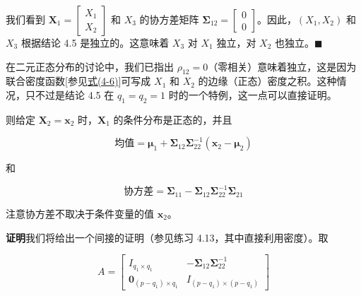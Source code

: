 我们看到 $\mathbf{X}_1=\begin{bmatrix}X_1\\X_2\end{bmatrix}$ 和 $X_3$ 的协方差矩阵 $\boldsymbol{\Sigma}_{12}=\begin{bmatrix}0\\0\end{bmatrix}$。因此，$(X_1,X_2)$ 和 $X_3$ 根据结论 4.5 是独立的。这意味着 $X_3$ 对 $X_1$ 独立，对 $X_2$ 也独立。\hfill$\blacksquare$

在二元正态分布的讨论中，我们已指出 $\rho_{12}=0$（零相关）意味着独立，这是因为联合密度函数[参见\hyperref[eq:4-6]{式(4-6)}]可写成 $X_1$ 和 $X_2$ 的边缘（正态）密度之积。这种情况，只不过是结论 4.5 在 $q_1=q_2=1$ 时的一个特例，这一点可以直接证明。


则给定 $\mathbf{X}_2=\mathbf{x}_2$ 时，$\mathbf{X}_1$ 的条件分布是正态的，并且

\[
\text{均值}=\boldsymbol{\mu}_1+\boldsymbol{\Sigma}_{12}\boldsymbol{\Sigma}_{22}^{-1}(\mathbf{x}_2-\boldsymbol{\mu}_2)
\]

和

\[
\text{协方差}=\boldsymbol{\Sigma}_{11}-\boldsymbol{\Sigma}_{12}\boldsymbol{\Sigma}_{22}^{-1}\boldsymbol{\Sigma}_{21}
\]

注意协方差不取决于条件变量的值 $\mathbf{x}_2$。

\noindent\textbf{证明}\quad 我们将给出一个间接的证明（参见练习 4.13，其中直接利用密度）。取

\[
A=\begin{bmatrix}
I_{q_1\times q_1} & -\boldsymbol{\Sigma}_{12}\boldsymbol{\Sigma}_{22}^{-1}\\[2pt]
\mathbf{0}_{(p-q_1)\times q_1} & I_{(p-q_1)\times(p-q_1)}
\end{bmatrix}
\]

